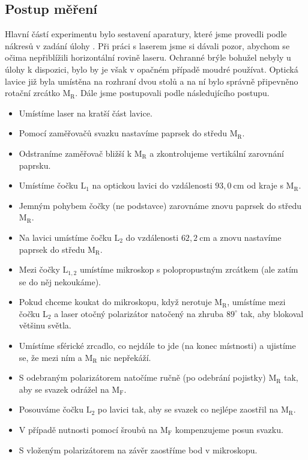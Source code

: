\documentclass[english]{article}
\newcommand{\unit}[1]{\ \mathrm{#1}}
\newcommand{\bb}[1]{\boldmath{}\textbf{$\mathrm{#1}$}\unboldmath{}}
\begin{document}
	\subsection{Postup měření}
		Hlavní částí experimentu bylo sestavení aparatury, které jsme provedli podle nákresů v zadání úlohy \cite{bib:zadani}. Při práci s laserem jsme si dávali pozor, abychom se očima nepřiblížili horizontální rovině laseru. Ochranné brýle bohužel nebyly u úlohy k dispozici, bylo by je však v opačném případě moudré používat. Optická lavice již byla umístěna na rozhraní dvou stolů a na ní bylo správně připevněno rotační zrcátko \bb{M_R}. Dále jsme postupovali podle následujícího postupu.
		\begin{itemize}
			\item Umístíme laser na kratší část lavice.
			\item Pomocí zaměřovačů svazku nastavíme paprsek do středu \bb{M_R}.
			\item Odstraníme zaměřovač bližší k \bb{M_R} a zkontrolujeme vertikální zarovnání paprsku.
			\item Umístíme čočku \bb{L_1} na optickou lavici do vzdálenosti $93,0\unit{cm}$ od kraje s \bb{M_R}.
			\item Jemným pohybem čočky (ne podstavce) zarovnáme znovu paprsek do středu \bb{M_R}.
			\item Na lavici umístíme čočku \bb{L_2} do vzdálenosti $62,2\unit{cm}$ a znovu nastavíme paprsek do středu \bb{M_R}.
			\item Mezi čočky \bb{L_{1,2}} umístíme mikroskop s polopropustným zrcátkem (ale zatím se do něj nekoukáme).
			\item Pokud chceme koukat do mikroskopu, když nerotuje \bb{M_R}, umístíme mezi čočku \bb{L_2} a laser otočný polarizátor natočený na zhruba $89^\circ$ tak, aby blokoval většinu světla.
			\item Umístíme sférické zrcadlo, co nejdále to jde (na konec místnosti) a ujistíme se, že mezi ním a \bb{M_R} nic nepřekáží.
			\item S odebraným polarizátorem natočíme ručně (po odebrání pojistky) \bb{M_R} tak, aby se svazek odrážel na \bb{M_F}.
			\item Posouváme čočku \bb{L_2} po lavici tak, aby se svazek co nejlépe zaostřil na \bb{M_R}.
			\item V případě nutnosti pomocí šroubů na \bb{M_F} kompenzujeme posun svazku.
			\item S vloženým polarizátorem na závěr zaostříme bod v mikroskopu.
		\end{itemize}  
		
\end{document}
